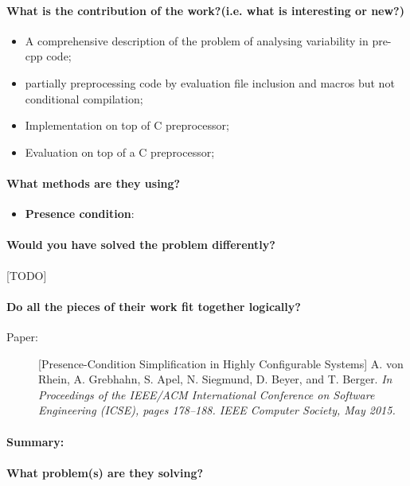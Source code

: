 \documentclass[12pt]{article}
\begin{document}
\paragraph{What is the contribution of the work?(i.e. what is interesting or new?)}
\begin{itemize}
	\item A comprehensive description of the problem of analysing variability in pre-cpp code;
	\item partially preprocessing code by evaluation file inclusion and macros but not conditional compilation;
	\item Implementation on top of C preprocessor;
	\item Evaluation on top of a C preprocessor;
\end{itemize}

\paragraph{What methods are they using?}
\begin{itemize}
	\item \textbf{Presence condition}: 
\end{itemize}

\paragraph{Would you have solved the problem differently?}[TODO]
\paragraph{Do all the pieces of their work fit together logically?}


\clearpage
\begin{description}
\item[Paper:] [Presence-Condition Simplification in Highly Configurable Systems] A. von Rhein, A. Grebhahn, S. Apel, N. Siegmund, D. Beyer, and T. Berger. \emph{In Proceedings of the IEEE/ACM International Conference on Software Engineering (ICSE), pages 178–188. IEEE Computer Society, May 2015.} 
\end{description}

\paragraph{Summary:}
\paragraph{What problem(s) are they solving?} 
\end{document}
